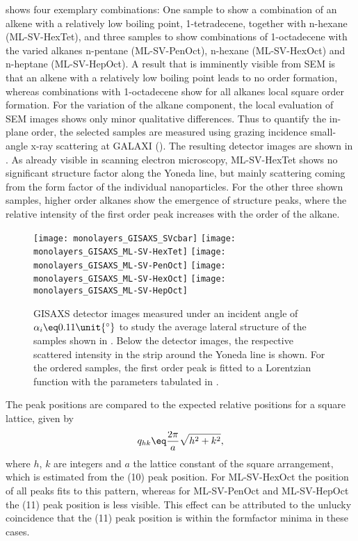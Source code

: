 \documentclass[\main/dresen_thesis.tex]{subfiles}
\begin{document}
     shows four exemplary combinations: One sample to show a combination of an alkene with a relatively low boiling point, 1-tetradecene, together with n-hexane (ML-SV-HexTet), and three samples to show combinations of 1-octadecene with the varied alkanes n-pentane (ML-SV-PenOct), n-hexane (ML-SV-HexOct) and n-heptane (ML-SV-HepOct).
    A result that is imminently visible from SEM is that an alkene with a relatively low boiling point leads to no order formation, whereas  combinations with 1-octadecene show for all alkanes local square order formation.
    For the variation of the alkane component, the local evaluation of SEM images shows only minor qualitative differences.
    Thus to quantify the in-plane order, the selected samples are measured using grazing incidence small-angle x-ray scattering at GALAXI ().
    The resulting detector images are shown in .
    As already visible in scanning electron microscopy, ML-SV-HexTet shows no significant structure factor along the Yoneda line, but mainly scattering coming from the form factor of the individual nanoparticles.
    For the other three shown samples, higher order alkanes show the emergence of structure peaks, where the relative intensity of the first order peak increases with the order of the alkane.

    \begin{figure}[tb]
      \centering
      \texttt{[image: monolayers\_GISAXS\_SVcbar]}
      \texttt{[image: monolayers\_GISAXS\_ML-SV-HexTet]}
      \texttt{[image: monolayers\_GISAXS\_ML-SV-PenOct]}
      \texttt{[image: monolayers\_GISAXS\_ML-SV-HexOct]}
      \texttt{[image: monolayers\_GISAXS\_ML-SV-HepOct]}
      \caption{\label{fig:monolayers:preparation:solventVariation:gisaxs}GISAXS detector images measured under an incident angle of $\alpha_i \eq 0.11 \unit{^\circ}$ to study the average lateral structure of the samples shown in . Below the detector images, the respective scattered intensity in the strip around the Yoneda line is shown. For the ordered samples, the first order peak is fitted to a Lorentzian function with the parameters tabulated in .}
    \end{figure}

    The peak positions are compared to the expected relative positions for a square lattice, given by
    \begin{align}
      q_{hk} \eq \frac{2 \pi}{a} \sqrt{h^2 + k^2},
    \end{align}
    where $h$, $k$ are integers and $a$ the lattice constant of the square arrangement, which is estimated from the (10) peak position.
    For ML-SV-HexOct the position of all peaks fits to this pattern, whereas for ML-SV-PenOct and ML-SV-HepOct the (11) peak position is less visible.
    This effect can be attributed to the unlucky coincidence that the (11) peak position is within the formfactor minima in these cases.
    \FloatBarrier
\end{document}
